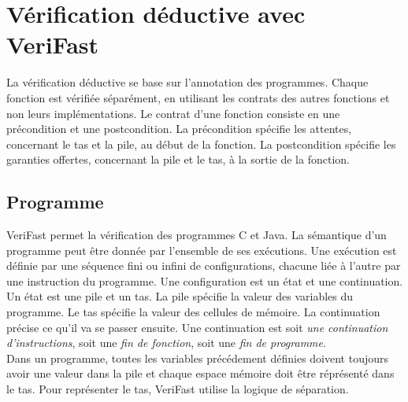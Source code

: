 \documentclass[11pt,openany]{article}
\newcommand{\verifast}{VeriFast}
\begin{document}
\section{V\'erification d\'eductive avec \verifast{}}
	La v\'erification d\'eductive se base sur l'annotation des programmes. Chaque fonction est v\'erifi\'ee s\'epar\'ement, en utilisant les contrats des autres fonctions et non leurs impl\'ementations. Le contrat d'une fonction consiste en une pr\'econdition et une postcondition. La pr\'econdition sp\'ecifie les attentes, concernant le tas et la pile, au d\'ebut de la fonction. La postcondition sp\'ecifie les garanties offertes, concernant la pile et le tas, \`a la sortie de la fonction.
	\subsection{Programme}
		\verifast{} permet la v\'erification des programmes C et Java. La s\'emantique d'un programme peut \^etre donn\'ee par l'ensemble de ses ex\'ecutions. Une ex\'ecution est d\'efinie par une s\'equence fini ou infini de configurations, chacune li\'ee \`a l'autre par une instruction du programme. Une configuration est un \'etat et une continuation. Un \'etat est une pile et un tas. La pile sp\'ecifie la valeur des variables du programme. Le tas sp\'ecifie la valeur des cellules de m\'emoire. La continuation pr\'ecise ce qu'il va se passer ensuite. Une continuation est soit \textit{une continuation d'instructions}, soit une \textit{fin de fonction}, soit une \textit{fin de programme}.\\
	Dans un programme, toutes les variables pr\'ec\'edement d\'efinies doivent toujours avoir une valeur dans la pile et chaque espace m\'emoire doit \^etre r\'epr\'esent\'e dans le tas. Pour repr\'esenter le tas, \verifast{} utilise la logique de s\'eparation.
\end{document}
